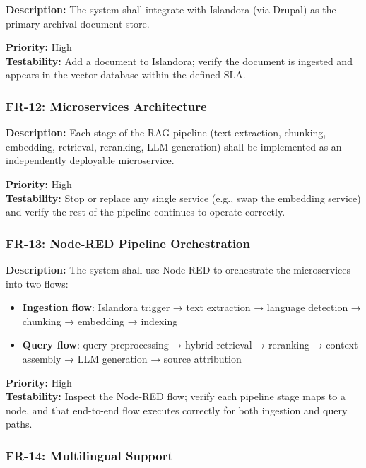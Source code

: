 \documentclass[
  11pt,
]{article}
\providecommand{\tightlist}{%
  \setlength{\itemsep}{0pt}\setlength{\parskip}{0pt}}
\begin{document}
\textbf{Description:} The system shall integrate with Islandora (via
Drupal) as the primary archival document store.

\textbf{Priority:} High\\
\textbf{Testability:} Add a document to Islandora; verify the document
is ingested and appears in the vector database within the defined SLA.

\subsubsection{FR-12: Microservices
Architecture}\label{fr-12-microservices-architecture}

\textbf{Description:} Each stage of the RAG pipeline (text extraction,
chunking, embedding, retrieval, reranking, LLM generation) shall be
implemented as an independently deployable microservice.

\textbf{Priority:} High\\
\textbf{Testability:} Stop or replace any single service (e.g., swap the
embedding service) and verify the rest of the pipeline continues to
operate correctly.

\subsubsection{FR-13: Node-RED Pipeline
Orchestration}\label{fr-13-node-red-pipeline-orchestration}

\textbf{Description:} The system shall use Node-RED to orchestrate the
microservices into two flows:

\begin{itemize}
\tightlist
\item
  \textbf{Ingestion flow}: Islandora trigger → text extraction →
  language detection → chunking → embedding → indexing
\item
  \textbf{Query flow}: query preprocessing → hybrid retrieval →
  reranking → context assembly → LLM generation → source attribution
\end{itemize}

\textbf{Priority:} High\\
\textbf{Testability:} Inspect the Node-RED flow; verify each pipeline
stage maps to a node, and that end-to-end flow executes correctly for
both ingestion and query paths.

\subsubsection{FR-14: Multilingual
Support}\label{fr-14-multilingual-support}
\end{document}
